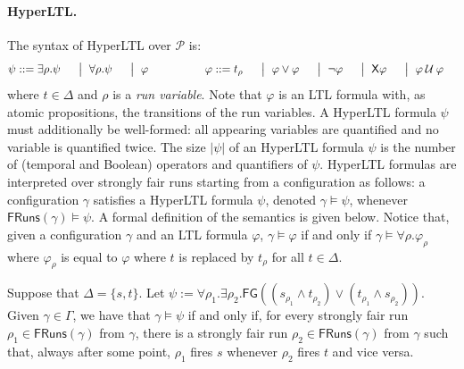 \documentclass[10pt,a4paper]{article}
\newcommand{\set}[1]{\{#1\}}
\newcommand{\deff}{:=}
\newcommand{\size}[1]{|#1|}
\newcommand{\prot}{\mathcal{P}}
\newcommand{\fairrunsfrom}[1]{\mathsf{FRuns}(#1)}
\newcommand{\config}{\gamma}
\newcommand{\configs}{\Gamma}
\newcommand{\run}{\rho}
\newcommand{\transitions}{\Delta}
\newcommand*{\atrans}{t}
\newcommand{\DefOR}{\ensuremath{\hspace{0.6em}\big|\hspace{0.6em}}}
\newcommand{\ltlnext}{\mathsf{X}}
\newcommand{\ltlglobally}{\mathsf{G}}
\newcommand{\ltlfinally}{\mathsf{F}}
\newcommand{\ltluntil}{\mathbin \mathcal{U}}
\newcommand{\U}{\ltluntil}
\newcommand{\Next}{\ltlnext}
\newcommand{\modelsLTL}{\ensuremath{\models}}
\newcommand{\modelsHLTL}{\ensuremath{\models}}
\begin{document}
\paragraph*{HyperLTL.}
%
%
The syntax of HyperLTL over \(\prot\) is:
%
\begin{alignat*}{9}
	                                        & \psi   ::= \exists \run. \psi &                             & \DefOR \forall \run.\psi &                     & \DefOR \varphi &   &
	\qquad \qquad \varphi  ::= \atrans_\run &                               & \DefOR \varphi \lor \varphi &                          & \DefOR \neg \varphi &                &
	\DefOR \Next \varphi                    &                               & \DefOR \varphi \U\varphi
\end{alignat*}
%
where \(\atrans \in \transitions\) and \(\run\) is a \emph{run
	variable}.
Note that \(\varphi\) is an LTL formula with, as atomic propositions, the transitions of the run variables.
A HyperLTL formula \(\psi\) must additionally be well-formed: all appearing variables are quantified and no variable is quantified twice.
The size \(\size{\psi}\) of an HyperLTL formula \(\psi\) is the number of (temporal and Boolean) operators and quantifiers of \(\psi\).
HyperLTL formulas are interpreted over strongly fair runs starting from a configuration as follows: a configuration \(\config\) satisfies a HyperLTL formula \(\psi\), denoted \(\config \modelsHLTL \psi\), whenever \(\fairrunsfrom{\config} \modelsHLTL \psi\).
A formal definition of the semantics is given below.
Notice that, given a configuration \(\config\) and an LTL formula \(\varphi\), \(\config \modelsLTL \varphi\) if and only if \(\config \modelsHLTL \forall \run.
\varphi_\run\) where \(\varphi_\run\) is equal to \(\varphi\) where \(\atrans\) is replaced by \(\atrans_\run\) for all \(\atrans \in \transitions\).

\begin{example}
	Suppose that \(\transitions = \set{s,t}\).
	Let \(\psi \deff \forall \run_1.
	\exists \run_2. \ltlfinally \ltlglobally ((s_{\run_1} \land t_{\run_2}) \lor (t_{\run_1} \land s_{\run_2}))\).
	Given \(\config \in \configs\), we have that \(\config \models \psi\) if and only if, for every strongly fair run \(\run_1 \in \fairrunsfrom{\config}\) from \(\config\), there is a strongly fair run \(\run_2 \in \fairrunsfrom{\config}\) from \(\config\) such that, always after some point, \(\run_1\) fires \(s\) whenever \(\run_2\) fires \(t\) and vice versa.
\end{example}
\end{document}
